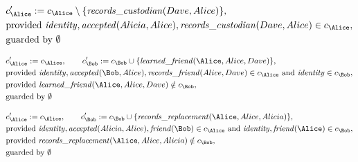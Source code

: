 \begin{align*}
&
c'_
{
\Alice
}
 := 
c_
{
\Alice
}
 \setminus 
\{
\mathit{\detokenize{
records_custodian
}}
(
Dave
,
Alice
)
\}
,\\
&
\text{provided } 
\mathit{\detokenize{
identity
}}
,
\mathit{\detokenize{
accepted
}}
(
Alicia
,
Alice
)
,
\mathit{\detokenize{
records_custodian
}}
(
Dave
,
Alice
)
 \in c_
{
\Alice
}
,\\
&
\text{guarded by } \emptyset
\end{align*}

\begin{align*}
&
c'_
{
\Alice
}
 := 
c_
{
\Alice
}
, \qquad 
c'_
{
\Bob
}
 := 
c_
{
\Bob
}
 \cup 
\{
\mathit{\detokenize{
learned_friend
}}
(
\Alice
,
Alice
,
Dave
)
\}
,\\
&
\text{provided } 
\mathit{\detokenize{
identity
}}
,
\mathit{\detokenize{
accepted
}}
(
\Bob
,
Alice
)
,
\mathit{\detokenize{
records_friend
}}
(
Alice
,
Dave
)
 \in c_
{
\Alice
}
 \text{ and } 
\mathit{\detokenize{
identity
}}
 \in c_
{
\Bob
}
,\\
&
\text{provided } 
\mathit{\detokenize{
learned_friend
}}
(
\Alice
,
Alice
,
Dave
)
 \notin c_
{
\Bob
}
,\\
&
\text{guarded by } \emptyset
\end{align*}

\begin{align*}
&
c'_
{
\Alice
}
 := 
c_
{
\Alice
}
, \qquad 
c'_
{
\Bob
}
 := 
c_
{
\Bob
}
 \cup 
\{
\mathit{\detokenize{
records_replacement
}}
(
\Alice
,
Alice
,
Alicia
)
\}
,\\
&
\text{provided } 
\mathit{\detokenize{
identity
}}
,
\mathit{\detokenize{
accepted
}}
(
Alicia
,
Alice
)
,
\mathit{\detokenize{
friend
}}
(
\Bob
)
 \in c_
{
\Alice
}
 \text{ and } 
\mathit{\detokenize{
identity
}}
,
\mathit{\detokenize{
friend
}}
(
\Alice
)
 \in c_
{
\Bob
}
,\\
&
\text{provided } 
\mathit{\detokenize{
records_replacement
}}
(
\Alice
,
Alice
,
Alicia
)
 \notin c_
{
\Bob
}
,\\
&
\text{guarded by } \emptyset
\end{align*}
